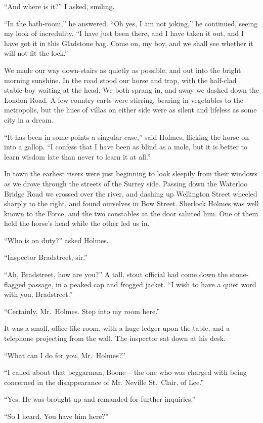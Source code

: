 “And where is it?” I asked, smiling.

“In the bath-room,” he answered. “Oh yes, I am not joking,”
he continued, seeing my look of incredulity. “I have
just been there, and I have taken it out, and I have got it
in this Gladstone bag. Come on, my boy, and we shall see
whether it will not fit the lock.”

We made our way down-stairs as quietly as possible, and
out into the bright morning sunshine. In the road stood our
horse and trap, with the half-clad stable-boy waiting at the
head. We both sprang in, and away we dashed down the
London Road. A few country carts were stirring, bearing in
vegetables to the metropolis, but the lines of villas on either
side were as silent and lifeless as some city in a dream.

“It has been in some points a singular case,” said Holmes,
flicking the horse on into a gallop. “I confess that I have
been as blind as a mole, but it is better to learn wisdom late
than never to learn it at all.”

In town the earliest risers were just beginning to look sleepily
from their windows as we drove through the streets of the
Surrey side. Passing down the Waterloo Bridge Road we
crossed over the river, and dashing up Wellington Street
wheeled sharply to the right, and found ourselves in Bow
Street. Sherlock Holmes was well known to the Force, and
the two constables at the door saluted him. One of them
held the horse’s head while the other led us in.

“Who is on duty?” asked Holmes.

“Inspector Bradstreet, sir.”

“Ah, Bradstreet, how are you?” A tall, stout official had
come down the stone-flagged passage, in a peaked cap and
frogged jacket. “I wish to have a quiet word with you,
Bradstreet.”

“Certainly, Mr.~Holmes. Step into my room here.”

It was a small, office-like room, with a huge ledger upon the
table, and a telephone projecting from the wall. The inspector
sat down at his desk.

“What can I do for you, Mr.~Holmes?”

“I called about that beggarman, Boone -- the one who was
charged with being concerned in the disappearance of Mr.
Neville St.~Clair, of Lee.”

“Yes. He was brought up and remanded for further
inquiries.”

“So I heard. You have him here?”

